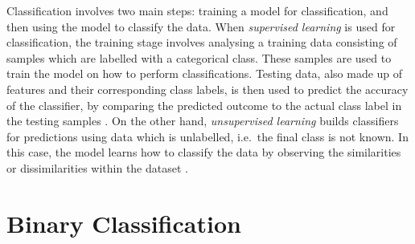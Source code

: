 Classification involves two main steps: training a model for classification, and then using the model to classify the data. When \textit{supervised learning} is used for classification, the training stage involves analysing a training data consisting of samples which are labelled with a categorical class. These samples are used to train the model on how to perform classifications. Testing data, also made up of features and their corresponding class labels, is then used to predict the accuracy of the classifier, by comparing the predicted outcome to the actual class label in the testing samples \citep{neelamegam2013}. On the other hand, \textit{unsupervised learning} builds classifiers for predictions using data which is unlabelled, i.e.\ the final class is not known. In this case, the model learns how to classify the data by observing the similarities or dissimilarities within the dataset \citep{jiawei2011}.

\section{Binary Classification}
\label{sec:binary classification}


